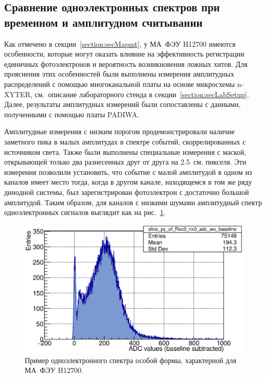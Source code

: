 \subsection{Сравнение одноэлектронных спектров при временном и амплитудном считывании}\label{section:secNxVsPadiwa}

Как отмечено в секции~\ref{section:secMapmt}, у МА~ФЭУ H12700 имеются особенности, которые могут оказать влияние на эффективность регистрации единичных фотоэлектронов и вероятность возникновения ложных хитов. Для прояснения этих особенностей были выполнены измерения амплитудных распределений с помощью многоканальной платы на основе микросхемы n-XYTER, см.~описание лабораторного стенда в секции~\ref{section:secLabSetup}. Далее, результаты амплитудных измерений были сопоставлены с данными, полученными с помощью платы PADIWA.

Амплитудные измерения с низким порогом продемонстрировали наличие заметного пика в малых амплитудах в спектре событий, скоррелированных с источником света. Также были выполнены специальные измерения с маской, открывающей только два разнесенных друг от друга на 2.5~см. пикселя. Эти измерения позволили установить, что событие с малой амплитудой в одном из каналов имеет место тогда, когда в другом канале, находящемся в том же ряду динодной системы, был зарегистрирован фотоэлектрон с достаточно большой амплитудой. Таким образом, для каналов с низкими шумами амплитудный спектр одноэлектронных сигналов выглядит как на рис.~\ref{fig:PeculiarSpectrum}.

\begin{figure}
\includegraphics[width=1.0\textwidth]{pictures/PeculiarSpectrum.eps}
\caption{Пример одноэлектронного спектра особой формы, характерной для МА~ФЭУ H12700.}
\label{fig:PeculiarSpectrum}
\end{figure}

